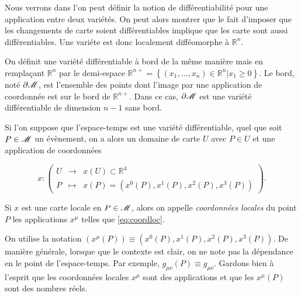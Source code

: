 \documentclass[a4paper,11pt]{report}
\begin{document}
            \begin{rmk}
                 Nous verrons dans l'on peut définir la notion de différentiabilité  pour une application entre deux variétés. On peut alors montrer que le fait d'imposer que les changements de carte soient différentiables implique que les carte sont aussi différentiables. Une variéte est donc localement difféomorphe à $\mathbb{R}^n$.
            \end{rmk}
            
            \begin{rmk}
                On définit une variété différentiable à bord de la même manière mais en remplaçant $\mathbb{R}^n$ par le demi-espace $\mathbb{R}^{n+}=\left\{(x_1,\dots,x_n)\in\mathbb{R}^n|x_1\geq 0\right\}$. Le bord, noté $\partial\mathscr{M}$, est l'ensemble des points dont l'image par une application de coordonnée est sur le bord de $\mathbb{R}^{n+}$. Dans ce cas, $\partial\mathscr{M}$ est une variété différentiable de dimension $n-1$ sans bord.
            \end{rmk}
            
            Si l'on suppose que l'espace-temps est une variété différentiable, quel que soit $P\in\mathscr{M}$ un évènement, on a alors un domaine de carte $U$ avec $P\in U$ et une application de coordonnées
            
            \begin{equation}\label{eq:coordloc}
            x:\left(
            \begin{array}{ccc}
                U & \longrightarrow & x(U) \subset \mathbb{R}^4  \\
                P & \longmapsto & x(P) = (x^0(P), x^1(P) , x^2(P), x^3(P))
            \end{array}
            \right).
            \end{equation}
            
            \begin{definition}
                Si $x$ est une carte locale en $P\in\mathscr{M}$, alors on appelle \textit{coordonnées locales} du point $P$ les applications $x^\mu$ telles que \ref{eq:coordloc}.
            \end{definition}
            
            On utilise la notation $(x^\mu(P)) \equiv (x^0(P),x^1(P),x^2(P),x^3(P))$. De manière générale, lorsque que le contexte est clair, on ne note pas la dépendance en le point de l'espace-temps. Par exemple, $g_{\mu\nu}(P)\equiv g_{\mu\nu}$. Gardons bien à l'esprit que les coordonnées locales $x^\mu$ sont des applications et que les $x^\mu(P)$ sont des nombres réels. 
            
\end{document}
